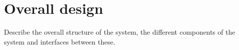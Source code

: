 \chapter{Overall design}

Describe the overall structure of the system, the different components of the system and interfaces between these.



